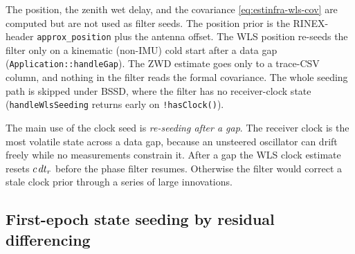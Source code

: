 \documentclass[main.tex]{subfiles}
\begin{document}
The position, the zenith wet delay, and the covariance
\eqref{eq:estinfra-wls-cov} are computed but are not used as filter
seeds.  The position prior is the RINEX-header
\texttt{approx\_position} plus the antenna offset.  The WLS position
re-seeds the filter only on a kinematic (non-IMU) cold start after a
data gap (\texttt{Application::handleGap}).  The ZWD estimate goes only
to a trace-CSV column, and nothing in the filter reads the formal
covariance.  The whole seeding path is skipped under BSSD, where the
filter has no receiver-clock state (\texttt{handleWlsSeeding} returns
early on \texttt{!hasClock()}).

The main use of the clock seed is \emph{re-seeding after a gap}.  The
receiver clock is the most volatile state across a data gap, because an
unsteered oscillator can drift freely while no measurements constrain
it.  After a gap the WLS clock estimate resets
$c\,dt_r$ before the phase filter resumes.  Otherwise
the filter would correct a stale clock prior through a series of large
innovations.

\subsection{First-epoch state seeding by residual differencing}
\label{sec:estinfra-init}
\end{document}
